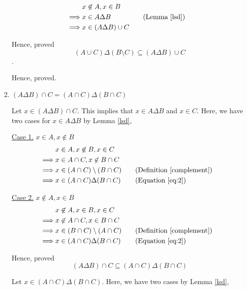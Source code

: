 \begin{enumerate}
\begin{named}[Part 2]
					\begin{align*}
						&x \not\in A, x \in B \\
						\implies &x \in A \Delta B
										 && \quad \text{(Lemma \ref{lsd})} \\
						\implies &x \in (A \Delta B) \cup C
					\end{align*}

					Hence, proved $$(A \cup C) \Delta (B \setminus C) \subseteq (A \Delta B) \cup C$$.
	      \end{named}
				Hence, proved.
	      \es

	\item $(A \Delta B) \cap C = (A \cap C) \Delta (B \cap C)$
		\bs
		\begin{named}[Part 1]
			Let $x \in (A \Delta B) \cap C$. This implies that $x \in A \Delta B$ and $x \in C$.
			Here, we have two cases for $x \in A \Delta B$ by Lemma \ref{lsd},

			\underline{Case 1.} $x \in A, x \not\in B$
			\begin{align*}
				& x \in A, x \not\in B, x \in C \\
				\implies & x \in A \cap C, x \not\in B \cap C \\
				\implies & x \in (A \cap C) \setminus (B \cap C) 
					&& \quad \text{(Definition \ref{complement})} \\
				\implies & x \in (A \cap C) \Delta (B \cap C)
					&& \quad \text{(Equation \ref{eq:2})} \\
			\end{align*}

			\underline{Case 2.} $x \not\in A, x \in B$
			\begin{align*}
				& x \not\in A, x \in B, x \in C \\
				\implies & x \not\in A \cap C, x \in B \cap C \\
				\implies & x \in (B \cap C) \setminus (A \cap C) 
					&& \quad \text{(Definition \ref{complement})} \\
				\implies & x \in (A \cap C) \Delta (B \cap C)
					&& \quad \text{(Equation \ref{eq:2})} \\
			\end{align*}

			Hence, proved $$(A \Delta B) \cap C \subseteq (A \cap C) \Delta (B \cap C)$$
		\end{named}
		\begin{named}[Part 2]
			Let $x \in (A \cap C) \Delta (B \cap C)$. Here, we have two cases by Lemma \ref{lsd},


\end{named}
\end{enumerate}
